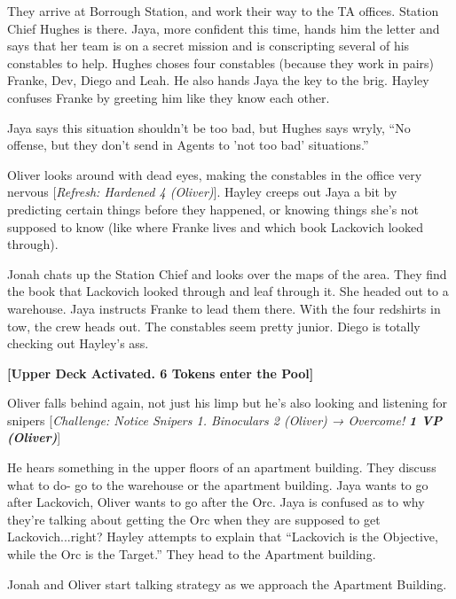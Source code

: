 They arrive at Borrough Station, and work their way to the TA offices.  Station Chief Hughes is there.  Jaya, more confident this time, hands him the letter and says that her team is on a secret mission and is conscripting several of his constables to help.  Hughes choses four constables (because they work in pairs) Franke, Dev, Diego and Leah.  He also hands Jaya the key to the brig.  Hayley confuses Franke by greeting him like they know each other.



Jaya says this situation shouldn't be too bad, but Hughes says wryly, ``No offense, but they don't send in Agents to 'not too bad' situations.''



Oliver looks around with dead eyes, making the constables in the office very nervous {[}\textit{Refresh: Hardened 4 (Oliver)}{]}.  Hayley creeps out Jaya a bit by predicting certain things before they happened, or knowing things she's not supposed to know (like where Franke lives and which book Lackovich looked through).



Jonah chats up the Station Chief and looks over the maps of the area.  They find the book that Lackovich looked through and leaf through it.  She headed out to a warehouse.  Jaya instructs Franke to lead them there.  With the four redshirts in tow, the crew heads out.  The constables seem pretty junior.  Diego is totally checking out Hayley's ass. 



\textbf{{[}Upper Deck Activated.  6 Tokens enter the Pool{]}}



Oliver falls behind again, not just his limp but he's also looking and listening for snipers {[}\textit{Challenge: Notice Snipers 1. Binoculars 2 (Oliver) → Overcome! }\textit{\textbf{1 VP (Oliver)}}{]}



He hears something in the upper floors of an apartment building.  They discuss what to do- go to the warehouse or the apartment building.  Jaya wants to go after Lackovich, Oliver wants to go after the Orc.  Jaya is confused as to why they're talking about getting the Orc when they are supposed to get Lackovich...right?  Hayley attempts to explain that ``Lackovich is the Objective, while the Orc is the Target.''  They head to the Apartment building.



Jonah and Oliver start talking strategy as we approach the Apartment Building.

